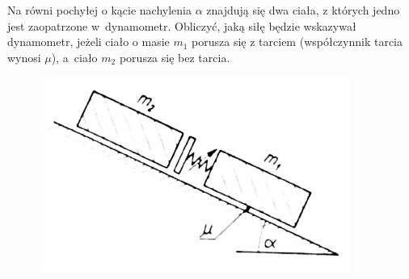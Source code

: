 Na równi pochyłej o kącie nachylenia \emph{$\alpha$} znajdują się dwa ciała, z których jedno jest zaopatrzone w~dynamometr. Obliczyć, jaką siłę będzie wskazywał dynamometr, jeżeli ciało o masie \emph{$m_1$} porusza się z tarciem (współczynnik tarcia wynosi $\mu$), a~ciało \emph{$m_2$} porusza się bez tarcia.
\begin{figure}[H]
	\centering
	\includegraphics[width=0.3\linewidth]{../rysunki/dynamika/dynamometr-dwa-klocki}
\end{figure}

